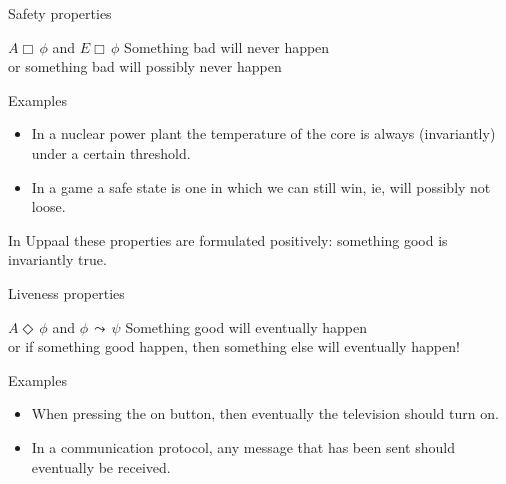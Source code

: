 \documentclass{beamer}
\def\dgold#1{{\darkgoldenrod #1}}
\def\dkb#1{{\blue #1}}
\begin{document}
\begin{slide}{Safety properties}
\small

\begin{block}{$A \Box\, \phi$ and $E \Box\, \phi$}
\vspace{5mm}
\dkb{Something bad will never happen}\\
 or \dkb{something bad will possibly never happen}
\vspace{5mm}

Examples\\
\begin{itemize}
\item \dgold{In a nuclear power plant the temperature of the core is always (invariantly) under a certain threshold}.
\item \dgold{In a game a safe state is one in which we can still win, ie, will possibly not loose}.
\end{itemize}

In Uppaal these properties are formulated positively: something good is invariantly true.
\end{block}

\end{slide}

\begin{slide}{Liveness properties}
\small

\begin{block}{$A \Diamond\, \phi$ and $\phi\, \leadsto \, \psi$}
\vspace{5mm}
\dkb{Something good will eventually happen}\\
 or \dkb{if something good happen, then something else will eventually happen!}
\vspace{5mm}

Examples\\
\begin{itemize}
\item \dgold{When pressing the on button, then eventually the television should turn on}.
\item \dgold{In a communication protocol, any message that has been sent should eventually be received}.
\end{itemize}

\end{block}

\end{slide}
\end{document}
